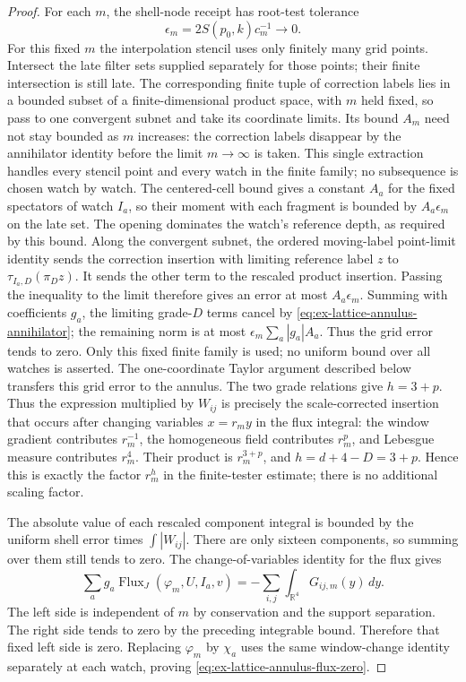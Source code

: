 \begin{proof}
For each $m$, the shell-node receipt has root-test tolerance
\[
  \epsilon_m=2S(p_0,k)c_m^{-1}\longrightarrow0.
\]
For this fixed $m$ the interpolation stencil uses only finitely many grid
points.  Intersect the late filter sets supplied separately for those points;
their finite intersection is still late.  The corresponding finite tuple of
correction labels lies in a bounded subset of a finite-dimensional product
space, with $m$ held fixed, so pass to one convergent subnet and take its
coordinate limits. Its bound $A_m$ need not stay
bounded as $m$ increases: the correction labels disappear by the
annihilator identity before the limit $m\to\infty$ is taken.  This
single extraction handles every stencil point and every watch in the finite
family; no subsequence is chosen watch by watch.  The
centered-cell bound gives a constant $A_a$ for the fixed spectators of
watch $I_a$, so their moment with each fragment is bounded by
$A_a\epsilon_m$ on the late set. The opening dominates the watch's
reference depth, as required by this bound. Along the convergent subnet,
the ordered moving-label point-limit identity sends the correction
insertion with limiting reference label $z$ to $\tau_{I_a,D}(\pi_Dz)$.
It sends the other term to the rescaled product insertion. Passing the
inequality to the limit therefore gives an error at most
$A_a\epsilon_m$.  Summing
with coefficients $g_a$, the limiting grade-$D$ terms cancel by
\eqref{eq:ex-lattice-annulus-annihilator}; the remaining norm is at most
$\epsilon_m\sum_a|g_a|A_a$.  Thus the grid error tends to zero.  Only this
fixed finite family is used; no uniform bound over all watches is asserted.
The one-coordinate Taylor argument described below transfers this grid error
to the annulus.  The two grade relations give $h=3+p$.  Thus the expression
multiplied by $W_{ij}$ is precisely the scale-corrected insertion that occurs
after changing variables $x=r_my$ in the flux integral: the window gradient
contributes $r_m^{-1}$, the homogeneous field contributes $r_m^p$, and
Lebesgue measure contributes $r_m^4$.  Their product is $r_m^{3+p}$, and
$h=d+4-D=3+p$.  Hence this is exactly the factor
$r_m^h$ in the finite-tester estimate; there is no additional scaling factor.

The absolute value of each rescaled component integral is bounded by the
uniform shell error times $\int |W_{ij}|$.  There are only sixteen components,
so summing over them still tends to zero.  The change-of-variables identity
for the flux gives
\[
 \sum_a g_a\operatorname{Flux}_{J}(\varphi_m,U,I_a,v)
   =-\sum_{i,j}\int_{\mathbb R^4}G_{ij,m}(y)\,dy.
\]
The left side is independent of $m$ by conservation and the support
separation.  The right side tends to zero by the preceding integrable bound.
Therefore that fixed left side is zero.  Replacing $\varphi_m$ by $\chi_a$
uses the same window-change identity separately at each watch, proving
\eqref{eq:ex-lattice-annulus-flux-zero}.\end{proof}

